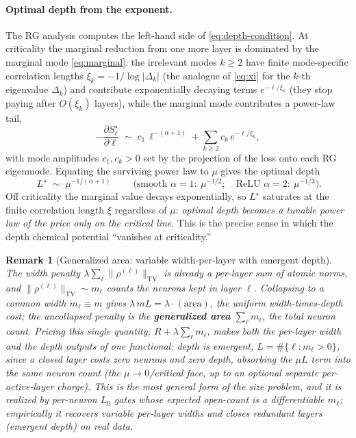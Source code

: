 \documentclass[11pt]{article}
\newtheorem{remark}{Remark}
\theoremstyle{definition}
\newcommand{\TV}{\mathrm{TV}}
\newcommand{\Lstar}{L^{\star}}
\begin{document}
\paragraph{Optimal depth from the exponent.} The RG analysis computes the left-hand side of
\eqref{eq:depth-condition}. At criticality the marginal reduction from one more layer is
dominated by the marginal mode \eqref{eq:marginal}: the irrelevant modes $k\ge2$ have finite
mode-specific correlation lengths $\xi_k=-1/\log|\Delta_k|$ (the analogue of \eqref{eq:xi}
for the $k$-th eigenvalue $\Delta_k$) and contribute exponentially decaying terms
$e^{-\ell/\xi_k}$ (they stop paying after $O(\xi_k)$ layers), while the marginal mode
contributes a power-law tail,
\begin{equation}
-\frac{\partial S_\ell^\star}{\partial \ell}\;\sim\;c_1\,\ell^{-(\alpha+1)}
+\sum_{k\ge2}c_k\,e^{-\ell/\xi_k},
\label{eq:marginal-value}
\end{equation}
with mode amplitudes $c_1,c_k>0$ set by the projection of the loss onto each RG eigenmode.
Equating the surviving power law to $\mu$ gives the optimal depth
\begin{equation}
\boxed{\;\Lstar\;\sim\;\mu^{-1/(\alpha+1)}\;}
\qquad
\big(\text{smooth }\alpha=1:\ \mu^{-1/2};\quad \text{ReLU }\alpha=2:\ \mu^{-1/3}\big).
\label{eq:Lstar}
\end{equation}
Off criticality the marginal value decays exponentially, so $\Lstar$ saturates at the finite
correlation length $\xi$ regardless of $\mu$: \emph{optimal depth becomes a tunable power law
of the price only on the critical line}. This is the precise sense in which the depth
chemical potential ``vanishes at criticality.''

\begin{remark}[Generalized area: variable width-per-layer with emergent depth]
The width penalty $\lambda\sum_\ell\|\rho^{(\ell)}\|_{\TV}$ is already a \emph{per-layer} sum of atomic norms,
and $\|\rho^{(\ell)}\|_{\TV}\sim m_\ell$ counts the neurons kept in layer $\ell$. Collapsing to a common
width $m_\ell\equiv m$ gives $\lambda\,m L=\lambda\cdot(\text{area})$, the uniform width-times-depth cost; the
\emph{uncollapsed} penalty is the \textbf{generalized area} $\sum_\ell m_\ell$, the total neuron count. Pricing
this single quantity, $R+\lambda\sum_\ell m_\ell$, makes both the per-layer width and the depth outputs of one
functional: depth is emergent, $L=\#\{\ell:m_\ell>0\}$, since a closed layer costs zero neurons and zero
depth, absorbing the $\mu L$ term into the same neuron count (the $\mu\to0$/critical face, up to an optional
separate per-active-layer charge). This is the most general form of the size problem, and it is realized by
per-neuron $L_0$ gates whose expected open-count is a differentiable $m_\ell$; empirically it recovers
variable per-layer widths and closes redundant layers (emergent depth) on real data.
\end{remark}
\end{document}
